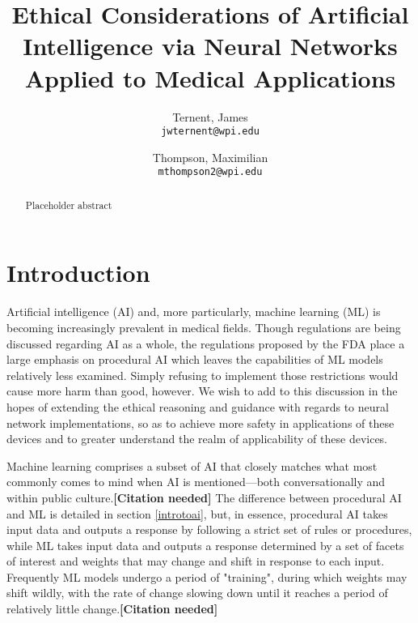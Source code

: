 \documentclass[]{article}
\title{Ethical Considerations of Artificial Intelligence via Neural Networks Applied to Medical Applications}
\author{
  Ternent, James\\
  \texttt{jwternent@wpi.edu}
  \and
  Thompson, Maximilian\\
  \texttt{mthompson2@wpi.edu}
}
\begin{document}
	
	\maketitle
	
	\begin{abstract}
		Placeholder abstract
	\end{abstract}
	
	\section{Introduction}
	
		Artificial intelligence (AI) and, more particularly, machine learning (ML) is becoming increasingly prevalent in medical fields. Though regulations are being discussed regarding AI as a whole, the regulations proposed by the FDA\cite{fdaregproposal} place a large emphasis on procedural AI which leaves the capabilities of ML models relatively less examined. Simply refusing to implement those restrictions would cause more harm than good, however. We wish to add to this discussion in the hopes of extending the ethical reasoning and guidance with regards to neural network implementations, so as to achieve more safety in applications of these devices and to greater understand the realm of applicability of these devices.

		Machine learning comprises a subset of AI that closely matches what most commonly comes to mind when AI is mentioned---both conversationally and within public culture.\textbf{[Citation needed]} The difference between procedural AI and ML is detailed in section \ref{introtoai}, but, in essence, procedural AI takes input data and outputs a response by following a strict set of rules or procedures, while ML takes input data and outputs a response determined by a set of facets of interest and weights that may change and shift in response to each input. Frequently ML models undergo a period of "training", during which weights may shift wildly, with the rate of change slowing down until it reaches a period of relatively little change.\textbf{[Citation needed]}
\end{document}

